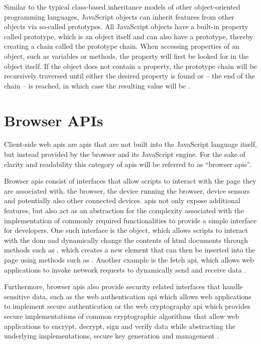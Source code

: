 Similar to the typical class-based inheritance models of other object-oriented programming languages, JavaScript objects can inherit features from other objects via so-called prototypes. All JavaScript objects have a built-in property called prototype, which is an object itself and can also have a prototype, thereby creating a chain called the prototype chain. When accessing properties of an object, such as variables or methods, the property will first be looked for in the object itself. If the object does not contain a property, the prototype chain will be recursively traversed until either the desired property is found or  – the end of the chain – is reached, in which case the resulting value will be . \cite{ECMA262_edition6, MozObjectPrototypes}



\section{Browser APIs}
\label{sec.browserAPIs}

Client-side web \acsp{api} are \acp{api} that are not built into the JavaScript language itself, but instead provided by the browser and its JavaScript engine. For the sake of clarity and readability this category of \acp{api} will be referred to as “browser \acsp{api}”.

Browser \acsp{api} consist of interfaces that allow scripts to interact with the page they are associated with, the browser, the device running the browser, device sensors and potentially also other connected devices. \acsp{api} not only expose additional features, but also act as an abstraction for the complexity associated with the implementation of commonly required functionalities to provide a simple interface for developers. \cite{MozWebAPIs}
One such interface is the  object, which allows scripts to interact with the \ac{dom} and dynamically change the contents of \acs{html} documents through methods such as , which creates a new element that can then be inserted into the page using methods such as  \cite{dom}. Another example is the fetch \acs{api}, which allows web applications to invoke network requests to dynamically send and receive data \cite{fetch}.

Furthermore, browser \acsp{api} also provide security related interfaces that handle sensitive data, such as the web authentication \acs{api} which allows web applications to implement secure authentication \cite{webauthn} or the web cryptography \acs{api} which provides secure implementations of common cryptographic algorithms that allow web applications to encrypt, decrypt, sign and verify data while abstracting the underlying implementations, secure key generation and management \cite{crypto}.

